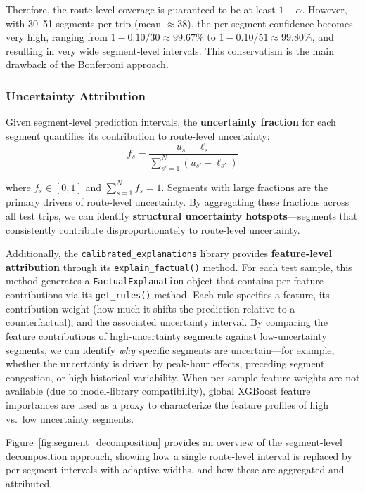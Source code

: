 Therefore, the route-level coverage is guaranteed to be at least $1-\alpha$. However, with 30--51 segments per trip (mean $\approx$38), the per-segment confidence becomes very high, ranging from $1 - 0.10/30 \approx 99.67\%$ to $1 - 0.10/51 \approx 99.80\%$, and resulting in very wide segment-level intervals. This conservatism is the main drawback of the Bonferroni approach.

\subsubsection{Uncertainty Attribution}
\label{subsubsec:uncertainty_attribution}

Given segment-level prediction intervals, the \textbf{uncertainty fraction} for each segment quantifies its contribution to route-level uncertainty:
\begin{equation}
    f_s = \frac{u_s - \ell_s}{\sum_{s'=1}^{N}(u_{s'} - \ell_{s'})}
    \label{eq:uncertainty_fraction}
\end{equation}

where $f_s \in [0, 1]$ and $\sum_{s=1}^{N} f_s = 1$. Segments with large fractions are the primary drivers of route-level uncertainty. By aggregating these fractions across all test trips, we can identify \textbf{structural uncertainty hotspots}—segments that consistently contribute disproportionately to route-level uncertainty.

Additionally, the \texttt{calibrated\_explanations} library provides \textbf{feature-level attribution} through its \texttt{explain\_factual()} method. For each test sample, this method generates a \texttt{FactualExplanation} object that contains per-feature contributions via its \texttt{get\_rules()} method. Each rule specifies a feature, its contribution weight (how much it shifts the prediction relative to a counterfactual), and the associated uncertainty interval. By comparing the feature contributions of high-uncertainty segments against low-uncertainty segments, we can identify \emph{why} specific segments are uncertain—for example, whether the uncertainty is driven by peak-hour effects, preceding segment congestion, or high historical variability. When per-sample feature weights are not available (due to model-library compatibility), global XGBoost feature importances are used as a proxy to characterize the feature profiles of high vs.\ low uncertainty segments.

Figure~\ref{fig:segment_decomposition} provides an overview of the segment-level decomposition approach, showing how a single route-level interval is replaced by per-segment intervals with adaptive widths, and how these are aggregated and attributed.

